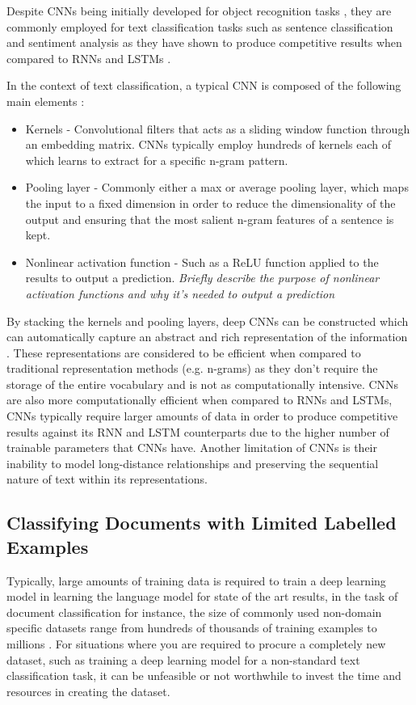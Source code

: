 \documentclass[a4paper,twoside,phd]{BYUPhys}
\begin{document}
Despite CNNs being initially developed for object recognition tasks \cite{LeCun1999}, they are commonly employed for text classification tasks such as sentence classification and sentiment analysis as they have shown to produce competitive results when compared to RNNs and LSTMs \cite{Collobert2011} \cite{Kim} \cite{Nogueira}. \newline

In the context of text classification, a typical CNN is composed of the following main elements \cite{Young}:

\begin{itemize}
	\item Kernels - Convolutional filters that acts as a sliding window function through an embedding matrix. CNNs typically employ hundreds of kernels each of which learns to extract for a specific n-gram pattern.
	\item Pooling layer - Commonly either a max or average pooling layer, which maps the input to a fixed dimension in order to reduce the dimensionality of the output and ensuring that the most salient n-gram features of a sentence is kept.
	\item Nonlinear activation function - Such as a ReLU function applied to the results to output a prediction. \textit{Briefly describe the purpose of nonlinear activation functions and why it's needed to output a prediction}
\end{itemize}

By stacking the kernels and pooling layers, deep CNNs can be constructed which can automatically capture an abstract and rich representation of the information \cite{Young}. These representations are considered to be efficient when compared to traditional representation methods (e.g. n-grams) as they don't require the storage of the entire vocabulary and is not as computationally intensive. CNNs are also more computationally efficient when compared to RNNs and LSTMs, CNNs typically require larger amounts of data in order to produce competitive results against its RNN and LSTM counterparts due to the higher number of trainable parameters that CNNs have. Another limitation of CNNs is their inability to model long-distance relationships and preserving the sequential nature of text within its representations.

\subsection{Classifying Documents with Limited Labelled Examples}
\label{sec:TransferLearning}
Typically, large amounts of training data is required to train a deep learning model in learning the language model for state of the art results, in the task of document classification for instance, the size of commonly used non-domain specific datasets range from hundreds of thousands of training examples to millions \cite{Conneau2017} \cite{Zhang}. For situations where you are required to procure a completely new dataset, such as training a deep learning model for a non-standard text classification task, it can be unfeasible  or not worthwhile to invest the time and resources in creating the dataset. 
\end{document}
